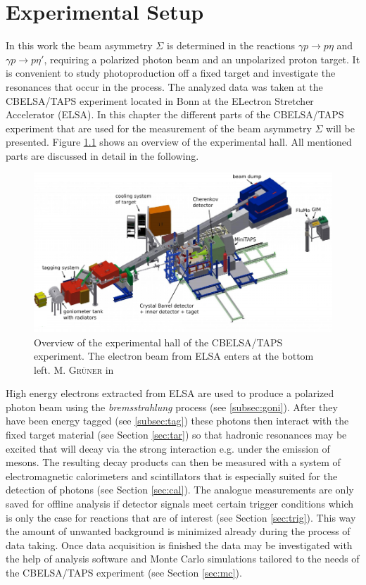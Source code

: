 \chapter{Experimental Setup}
\label{chap:exp}
In this work the beam asymmetry $\Sigma$ is determined in the reactions $\gamma p\to p\eta$ and $\gamma p\to p\eta'$, requiring a polarized photon beam and an unpolarized proton target. It is convenient to study photoproduction off a fixed target and investigate the resonances that occur in the process. The analyzed data was taken at the CBELSA/TAPS experiment located in Bonn  at the ELectron Stretcher Accelerator (ELSA). In this chapter the different parts of the CBELSA/TAPS experiment that are used for the measurement of the beam asymmetry $\Sigma$ will be presented. Figure \ref{fig:cbarea} shows an overview of the experimental hall. All mentioned parts are discussed in detail in the following.
\begin{figure}[htbp]
	\centering
	\includegraphics[width=\linewidth]{figs/cbarea.pdf}
	\caption{Overview of the experimental hall of the CBELSA/TAPS experiment. The electron beam from ELSA enters at the bottom left. \textsc{M. Grüner} in \cite{farahphd}}
	\label{fig:cbarea}
\end{figure}

\noindent High energy electrons extracted from ELSA are used to produce a polarized photon beam using the \emph{bremsstrahlung} process (see \ref{subsec:goni}). After they have been energy tagged (see \ref{subsec:tag}) these photons then interact with the fixed target material (see Section \ref{sec:tar}) so that hadronic resonances may be excited that will decay via the strong interaction e.g. under the emission of mesons. The resulting decay products can then be measured with a system of electromagnetic calorimeters and scintillators that is especially suited for the detection of photons (see Section \ref{sec:cal}). The analogue measurements are only saved for offline analysis if detector signals meet certain trigger conditions which is only the case for reactions that are of interest (see Section \ref{sec:trig}). This way the amount of unwanted background is minimized already during the process of data taking. Once data acquisition is finished the data may be investigated with the help of analysis software and Monte Carlo simulations tailored to the needs of the CBELSA/TAPS experiment (see Section \ref{sec:mc}).
